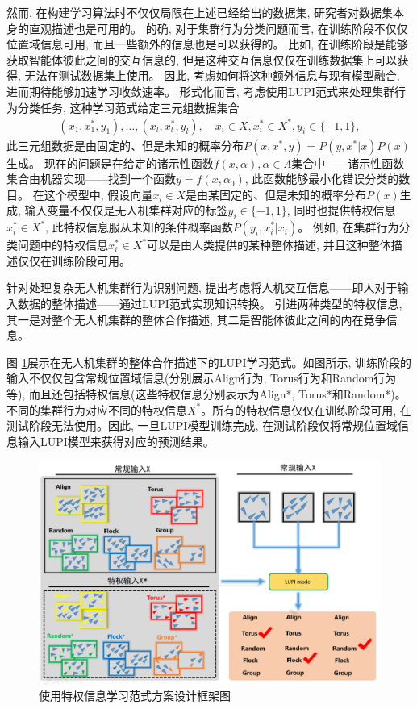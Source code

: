 然而, 在构建学习算法时不仅仅局限在上述已经给出的数据集, 研究者对数据集本身的直观描述也是可用的。 的确, 对于集群行为分类问题而言, 在训练阶段不仅仅位置域信息可用, 而且一些额外的信息也是可以获得的。 比如, 在训练阶段是能够获取智能体彼此之间的交互信息的, 但是这种交互信息仅仅在训练数据集上可以获得, 无法在测试数据集上使用。 因此, 考虑如何将这种额外信息与现有模型融合, 进而期待能够加速学习收敛速率。 形式化而言, 考虑使用LUPI范式来处理集群行为分类任务, 这种学习范式给定三元组数据集合
\begin{align}
(x_{1}, x_{1}^{*}, y_{1}), \ldots, (x_{l}, x_{l}^{*}, y_{l}), \quad x_{i} \in X, x_{i}^{*} \in X^{*}, y_{i} \in \{-1,1\},
\end{align}
此三元组数据是由固定的、但是未知的概率分布$P(x,x^{*},y) = P(y, x^{*} | x)P(x)$生成。 现在的问题是在给定的诸示性函数$f(x,\alpha), \alpha \in \Lambda$集合中——诸示性函数集合由机器实现——找到一个函数$y = f(x, \alpha_{0})$, 此函数能够最小化错误分类的数目。 在这个模型中, 假设向量$x_{i} \in X$是由某固定的、但是未知的概率分布$P(x)$生成, 输入变量不仅仅是无人机集群对应的标签$y_{i} \in \{-1, 1\}$, 同时也提供特权信息$x_{i}^{*} \in X^{*}$, 此特权信息服从未知的条件概率函数$P(y_{i},x_{i}^{*} | x_{i})$。 例如, 在集群行为分类问题中的特权信息$x_{i}^{*} \in X^{*}$可以是由人类提供的某种整体描述, 并且这种整体描述仅仅在训练阶段可用。


针对处理复杂无人机集群行为识别问题, 提出考虑将人机交互信息——即人对于输入数据的整体描述——通过LUPI范式实现知识转换。 引进两种类型的特权信息, 其一是对整个无人机集群的整体合作描述, 其二是智能体彼此之间的内在竞争信息。 

图 \ref{fig:demo}展示在无人机集群的整体合作描述下的LUPI学习范式。如图所示, 训练阶段的输入不仅仅包含常规位置域信息(分别展示Align行为, Torus行为和Random行为等), 而且还包括特权信息(这些特权信息分别表示为Align*, Torus*和Random*)。不同的集群行为对应不同的特权信息$X^{*}$。所有的特权信息仅仅在训练阶段可用, 在测试阶段无法使用。因此, 一旦LUPI模型训练完成, 在测试阶段仅将常规位置域信息输入LUPI模型来获得对应的预测结果。

\begin{figure}
\centering
\includegraphics[width=1\textwidth]{Img/chapter10/LUPI.png}
\caption{使用特权信息学习范式方案设计框架图}
\label{fig:demo}
\end{figure}

